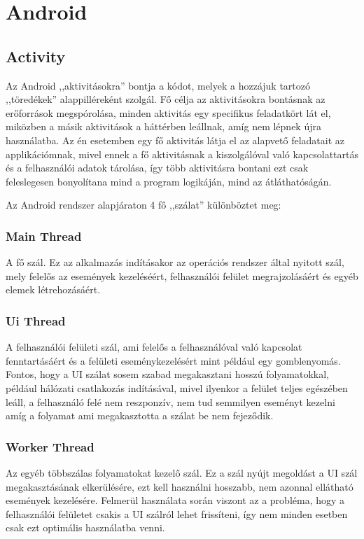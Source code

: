 \documentclass[]{thesis-ekf}
\theoremstyle{definition}
\theoremstyle{remark}
\begin{document}
\section{Android}
\subsection{Activity}
Az Android ,,aktivitásokra'' bontja a kódot, melyek a hozzájuk tartozó ,,töredékek'' alappilléreként szolgál.
Fő célja az aktivitásokra bontásnak az erőforrások megspórolása, minden aktivitás egy specifikus feladatkört lát el, 
miközben a másik aktivitások a háttérben leállnak, amíg nem lépnek újra használatba. Az én esetemben egy fő aktivitás
látja el az alapvető feladatait az applikációmnak, mivel ennek a fő aktivitásnak a kiszolgálóval való kapcsolattartás és
a felhasználói adatok tárolása, így több aktivitásra bontani ezt csak feleslegesen bonyolítana mind a program logikáján,
mind az átláthatóságán.

Az Android rendszer alapjáraton 4 fő ,,szálat'' különböztet meg:
\subsubsection{Main Thread}
A fő szál. Ez az alkalmazás indításakor az operációs rendszer által nyitott szál, mely felelős az események kezeléséért,
felhasználói felület megrajzolásáért és egyéb elemek létrehozásáért.
	
\subsubsection{Ui Thread}
A felhasználói felületi szál, ami felelős a felhasználóval való kapcsolat fenntartásáért 
és a felületi eseménykezelésért mint például egy gomblenyomás. Fontos, 
hogy a UI szálat sosem szabad megakasztani hosszú folyamatokkal, 
például hálózati csatlakozás indításával, mivel ilyenkor a felület teljes egészében leáll, 
a felhasználó felé nem reszponzív, nem tud semmilyen eseményt kezelni 
amíg a folyamat ami megakasztotta a szálat be nem fejeződik.
	
\subsubsection{Worker Thread}
Az egyéb többszálas folyamatokat kezelő szál. Ez a szál nyújt megoldást a UI szál megakasztásának elkerülésére,
ezt kell használni hosszabb, nem azonnal ellátható események kezelésére. Felmerül használata során viszont az a
probléma, hogy a felhasználói felületet csakis a UI szálról lehet frissíteni, így nem minden esetben csak ezt
optimális használatba venni. 
	
\end{document}

